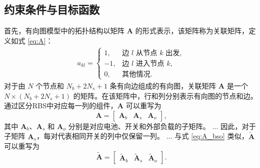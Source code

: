 \documentclass[a4paper,UTF8]{ctexart}
\begin{document}
\subsection{约束条件与目标函数}

首先，有向图模型中的拓扑结构以矩阵 $\boldsymbol{A}$ 的形式表示，该矩阵称为关联矩阵，定义如式 \eqref{eq:A}：
\begin{align}\label{eq:A}
    a_{kl}=
    \begin{cases}
        1,  & \text{边 $l$ 从节点 $k$ 出发},\\
        -1, & \text{边 $l$ 进入节点 $k$},\\
        0,  & \text{其他情况}.
    \end{cases}
\end{align}
对于由 $N$ 个节点和 $N_b+2N_s+1$ 条有向边组成的有向图，关联矩阵 $\boldsymbol{A}$ 是一个 $N\times(N_b+2N_s+1)$ 的矩阵。在该矩阵中，行和列分别表示有向图的节点和边。通过区分RBS中对应每一列的组件，$\boldsymbol{A}$ 可以重写为
\begin{equation}\label{eq:A_bso}
    \boldsymbol{A} =
    \begin{bmatrix}
        \boldsymbol{A}_b & \boldsymbol{A}_s & \boldsymbol{A}_o
    \end{bmatrix},
\end{equation}
其中 $\boldsymbol{A}_b$、$\boldsymbol{A}_s$ 和 $\boldsymbol{A}_o$ 分别是对应电池、开关和外部负载的子矩阵。
...
因此，对于子矩阵 $\boldsymbol{A}_s$，每对代表相同开关的列中仅保留一列。
...
与式 \eqref{eq:A_bso} 类似，$\boldsymbol{\tilde{A}}$ 可以重写为
\begin{equation}\label{eq:A_bso_tilde}
    \boldsymbol{\tilde{A}} =
    \begin{bmatrix}
        \boldsymbol{\tilde{A}}_b & \boldsymbol{\tilde{A}}_s & \boldsymbol{\tilde{A}}_o
    \end{bmatrix}.
\end{equation}




\end{document}
